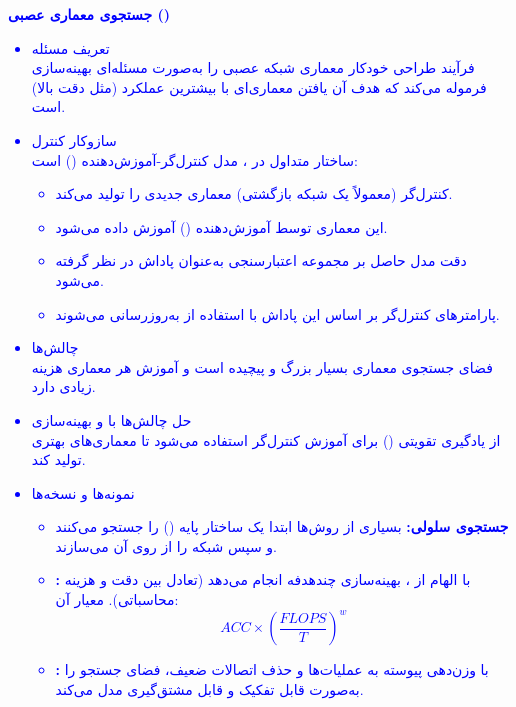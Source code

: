 \documentclass[12pt]{article}
\begin{document}
\begin{enumerate}
    \textcolor{blue}{
        \textbf{جستجوی معماری عصبی ()}
        \begin{itemize}
            \item تعریف مسئله\\
                 فرآیند طراحی خودکار معماری شبکه عصبی را به‌صورت مسئله‌ای بهینه‌سازی فرموله می‌کند که هدف آن یافتن معماری‌ای با بیشترین عملکرد (مثل دقت بالا) است.
            \item سازوکار کنترل\\
                ساختار متداول در ، مدل کنترل‌گر-آموزش‌دهنده () است:
                \begin{itemize}
                    \item کنترل‌گر (معمولاً یک شبکه بازگشتی) معماری جدیدی را تولید می‌کند.
                    \item این معماری توسط آموزش‌دهنده () آموزش داده می‌شود.
                    \item دقت مدل حاصل بر مجموعه اعتبارسنجی به‌عنوان پاداش در نظر گرفته می‌شود.
                    \item پارامترهای کنترل‌گر بر اساس این پاداش با استفاده از  به‌روزرسانی می‌شوند.
                \end{itemize}
            \item چالش‌ها\\
                فضای جستجوی معماری بسیار بزرگ و پیچیده است و آموزش هر معماری هزینه زیادی دارد.
            \item حل چالش‌ها با  و بهینه‌سازی\\
                از یادگیری تقویتی () برای آموزش کنترل‌گر استفاده می‌شود تا معماری‌های بهتری تولید کند.
            \item نمونه‌ها و نسخه‌ها\\
                \begin{itemize}
                    \item \textbf{جستجوی سلولی:} بسیاری از روش‌ها ابتدا یک ساختار پایه () را جستجو می‌کنند و سپس شبکه را از روی آن می‌سازند.
                    \item \textbf{:} با الهام از ، بهینه‌سازی چندهدفه انجام می‌دهد (تعادل بین دقت و هزینه محاسباتی). معیار آن:
                    $$
                    ACC \times \left( \frac{FLOPS}{T} \right)^w
                    $$
                    \item \textbf{:} با وزن‌دهی پیوسته به عملیات‌ها و حذف اتصالات ضعیف، فضای جستجو را به‌صورت قابل تفکیک و قابل مشتق‌گیری مدل می‌کند.

\end{itemize}
\end{itemize}}
\end{enumerate}
\end{document}
